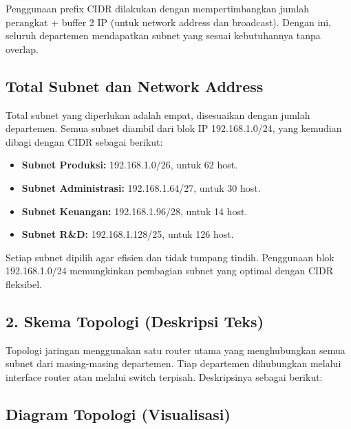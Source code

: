 \documentclass[12pt,a4paper]{article}
\begin{document}
Penggunaan prefix CIDR dilakukan dengan mempertimbangkan jumlah perangkat + buffer 2 IP (untuk network address dan broadcast). Dengan ini, seluruh departemen mendapatkan subnet yang sesuai kebutuhannya tanpa overlap.

\subsection*{Total Subnet dan Network Address}

Total subnet yang diperlukan adalah empat, disesuaikan dengan jumlah departemen. Semua subnet diambil dari blok IP 192.168.1.0/24, yang kemudian dibagi dengan CIDR sebagai berikut:

\begin{itemize}
\item \textbf{Subnet Produksi:} 192.168.1.0/26, untuk 62 host.
\item \textbf{Subnet Administrasi:} 192.168.1.64/27, untuk 30 host.
\item \textbf{Subnet Keuangan:} 192.168.1.96/28, untuk 14 host.
\item \textbf{Subnet R\&D:} 192.168.1.128/25, untuk 126 host.
\end{itemize}

Setiap subnet dipilih agar efisien dan tidak tumpang tindih. Penggunaan blok 192.168.1.0/24 memungkinkan pembagian subnet yang optimal dengan CIDR fleksibel.

\subsection*{2. Skema Topologi (Deskripsi Teks)}
Topologi jaringan menggunakan satu router utama yang menghubungkan semua subnet dari masing-masing departemen. Tiap departemen dihubungkan melalui interface router atau melalui switch terpisah. Deskripsinya sebagai berikut:
\subsection*{Diagram Topologi (Visualisasi)}
\end{document}
